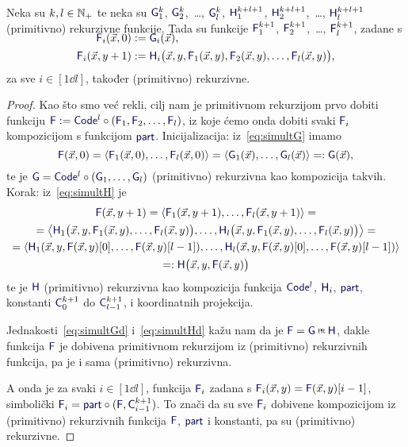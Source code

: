 \begin{propozicija}[{name=[o simultanoj rekurziji]}]\label{prop:simultrek}
    Neka su $k,l\in{\mathbb N}_+$ te neka su $\f G_1^k$, $\f G_2^k$,~\ldots, $\f G_l^k$, $\f H_1^{k+l+1}$, $\f H_2^{k+l+1}$,~\ldots, $\f H_l^{k+l+1}$ (primitivno) rekurzivne funkcije.  Tada su funkcije $\f F_1^{k+1}$, $\f F_2^{k+1}$,~\ldots, $\f F_l^{k+1}$, zadane s
\begin{align}
    \SwapAboveDisplaySkip
    \label{eq:simultG}\f F_i(\vec x,0)&:=\f G_i(\vec x)\text,\\
    \label{eq:simultH}
    \f F_i(\vec x,y+1)&:=\f H_i\bigl(\vec x,y,\f F_1(\vec x,y),\f F_2(\vec x,y),\dotsc,\f F_l(\vec x,y)\bigr)\text,
\end{align}
za sve $i\in[1\dd l]$, također (primitivno) rekurzivne.
\end{propozicija}
\begin{proof}
Kao što smo već rekli, cilj nam je primitivnom rekurzijom prvo dobiti funkciju $\f F:=\f{Code}^l\circ(\f F_1,\f F_2,\dotsc,\f F_l)$, iz koje ćemo onda dobiti svaki $\f F_i$ kompozicijom s funkcijom $\f{part}$. Inicijalizacija: iz~\eqref{eq:simultG} imamo
\begin{equation}\label{eq:simultGd}
    \f F(\vec x,0)=\langle \f F_1(\vec x,0),\dotsc,\f F_l(\vec x,0)\rangle=\langle \f G_1(\vec x),\dotsc,\f G_l(\vec x)\rangle=:\f G(\vec x)\text,
\end{equation}
te je $\f G=\f{Code}^l\circ(\f G_1,\dotsc,\f G_l)$ (primitivno) rekurzivna kao kompozicija takvih. Korak: iz~\eqref{eq:simultH} je
\begin{multline}\label{eq:simultHd}
\f F(\vec x,y+1)=\langle\f F_1(\vec x,y+1),\dotsc,\f F_l(\vec x,y+1)\rangle=\\
=\bigl\langle\f H_1\bigl(\vec x,y,\f F_1(\vec x,y),\dotsc,\f F_l(\vec x,y)\bigr),\dotsc,\f H_l\bigl(\vec x,y,\f F_1(\vec x,y),\dotsc,\f F_l(\vec x,y)\bigr)\bigr\rangle=\\
=\langle
\f H_1(\vec x,y,
\f F(\vec x,y)[0],
\dotsc,
\f F(\vec x,y)[l-1]),
\dotsc,
\f H_l(\vec x,y,
\f F(\vec x,y)[0],
\dotsc,
\f F(\vec x,y)[l-1])\rangle\\
=:\f H\bigl(\vec x,y,\f F(\vec x,y)\bigr)
\end{multline}
te je $\f H$ (primitivno) rekurzivna kao kompozicija funkcija $\f{Code}^l$, $\f H_i$, $\f{part}$, konstanti $\f C_0^{k+1}$ do $\f C_{l-1}^{k+1}$, i koordinatnih projekcija.

Jednakosti~\eqref{eq:simultGd} i~\eqref{eq:simultHd} kažu nam da je $\f F=\f G\pr\f H$, dakle funkcija $\f F$ je dobivena primitivnom rekurzijom iz (primitivno) rekurzivnih funkcija, pa je i sama (primitivno) rekurzivna. 

A onda je za svaki $i\in[1\dd l]$, funkcija $\f F_i$ zadana s $\f F_i(\vec x, y)=\f F(\vec x,y)[i-1]$, simbolički $\f F_i=\f{part}\circ(\f F,\f C_{i-1}^{k+1})$. To znači da su sve $\f F_i$ dobivene kompozicijom iz (primitivno) rekurzivnih funkcija $\f F$, $\f{part}$ i konstanti, pa su (primitivno) rekurzivne.
\end{proof}

